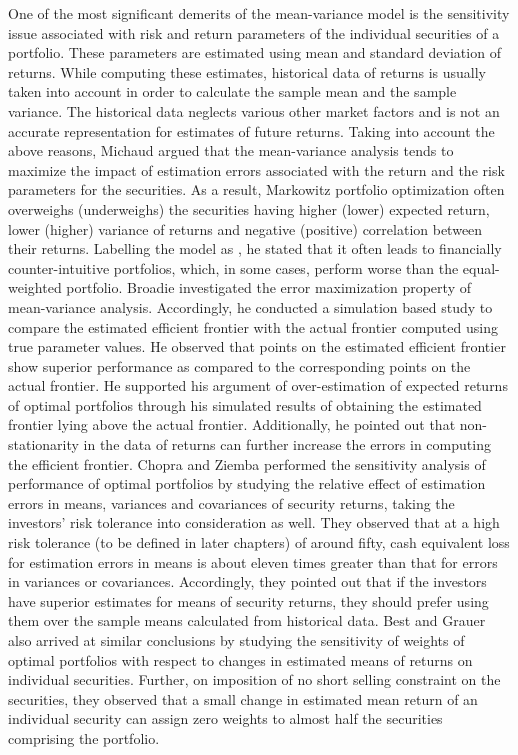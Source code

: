 One of the most significant demerits of the mean-variance model is the sensitivity issue associated with risk and return parameters of the individual securities of a portfolio. These parameters are estimated using mean and standard deviation of returns. While computing these estimates, historical data of returns is usually taken into account in order to calculate the sample mean and the sample variance. The historical data neglects various other market factors and is not an accurate representation for estimates of future returns. Taking into account the above reasons, Michaud \cite{Michaud} argued that the mean-variance analysis tends to maximize the impact of estimation errors associated with the return and the risk parameters for the securities. As a result, Markowitz portfolio optimization often overweighs (underweighs) the securities having higher (lower) expected return, lower (higher) variance of returns and negative (positive) correlation between their returns. Labelling the model as , he stated that it often leads to financially counter-intuitive portfolios, which, in some cases, perform worse than the equal-weighted portfolio. Broadie \cite{Broadie} investigated the error maximization property of mean-variance analysis. Accordingly, he conducted a simulation based study to compare the estimated efficient frontier with the actual frontier computed using true parameter values. He observed that points on the estimated efficient frontier show superior performance as compared to the corresponding points on the actual frontier. He supported his argument of over-estimation of expected returns of optimal portfolios through his simulated results of obtaining the estimated frontier lying above the actual frontier. Additionally, he pointed out that non-stationarity in the data of returns can further increase the errors in computing the efficient frontier. Chopra and Ziemba \cite{Chopra} performed the sensitivity analysis of performance of optimal portfolios by studying the relative effect of estimation errors in means, variances and covariances of security returns, taking the investors' risk tolerance into consideration as well. They observed that at a high risk tolerance (to be defined in later chapters) of around fifty, cash equivalent loss for estimation errors in means is about eleven times greater than that for errors in variances or covariances. Accordingly, they pointed out that if the investors have superior estimates for means of security returns, they should prefer using them over the sample means calculated from historical data. Best and Grauer \cite{Best1,Best2} also arrived at similar conclusions by studying the sensitivity of weights of optimal portfolios with respect to changes in estimated means of returns on individual securities. Further, on imposition of no short selling constraint on the securities, they observed that a small change in estimated mean return of an individual security can assign zero weights to almost half the securities comprising the portfolio.

